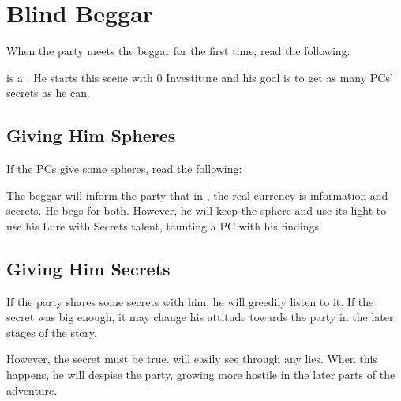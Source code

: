 \section{Blind Beggar}
\label{sec:1stMeeting}

When the party meets the beggar for the first time, read the following:


\npcBlindBeggar[s] is a \enemyCorruptedLightweaverC{}. He starts this scene with 0 Investiture and his goal is to get as many PCs' secrets as he can.

\subsection{Giving Him Spheres}

If the PCs give \npcBlindBeggar{} some spheres, read the following:


The beggar will inform the party that in \locationYeddaw{}, the real currency is information and secrets. He begs for both. However, he will keep the sphere and use its light to use his Lure with Secrets talent, taunting a PC with his findings.


\subsection{Giving Him Secrets}

If the party shares some secrets with him, he will greedily listen to it. If the secret was big enough, it may change his attitude towards the party in the later stages of the story. 

However, the secret must be true. \npcBlindBeggar{} will easily see through any lies. When this happens, he will despise the party, growing more hostile in the later parts of the adventure.

